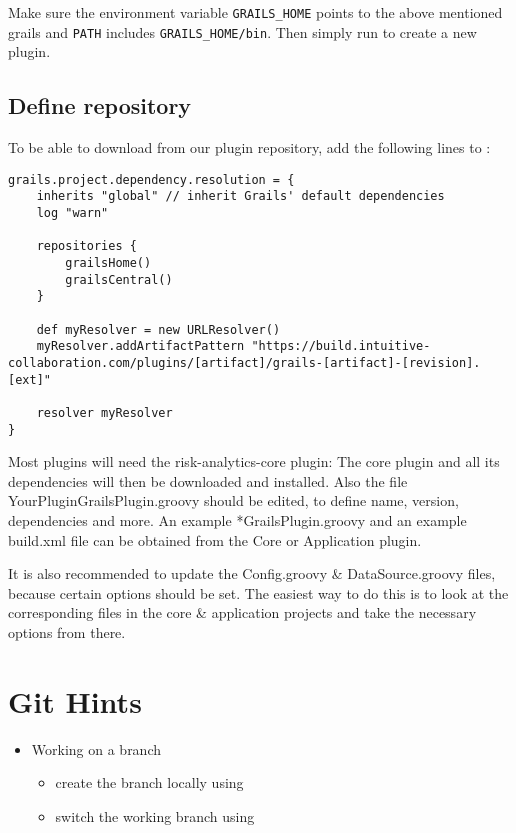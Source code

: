 Make sure the environment variable \texttt{GRAILS\_HOME} points to the above mentioned
grails and \texttt{PATH} includes \texttt{GRAILS\_HOME/bin}.
Then simply run  to create a new plugin.

\subsection{Define \PO{} repository}

To be able to download from our plugin repository, add the following lines to
:
\begin{verbatim}
grails.project.dependency.resolution = {
    inherits "global" // inherit Grails' default dependencies
    log "warn"

    repositories {
        grailsHome()
        grailsCentral()
    }

    def myResolver = new URLResolver()
    myResolver.addArtifactPattern "https://build.intuitive-collaboration.com/plugins/[artifact]/grails-[artifact]-[revision].[ext]"

    resolver myResolver
}
\end{verbatim}

Most plugins will need the risk-analytics-core plugin:
The core plugin and all its dependencies will then be downloaded and installed.
Also the file YourPluginGrailsPlugin.groovy should be edited, to define name, version, dependencies and more.
An example *GrailsPlugin.groovy and an example build.xml file can be obtained from the Core or Application plugin.

It is also recommended to update the Config.groovy \& DataSource.groovy files, because certain options should be set.
The easiest way to do this is to look at the corresponding files in the core \& application projects and take the necessary options from there.

\section{Git Hints}

\begin{itemize}
	\item Working on a branch
	\begin{itemize}
		\item create the branch locally using 
		\item switch the working branch using 
	\end{itemize}
\end{itemize}

